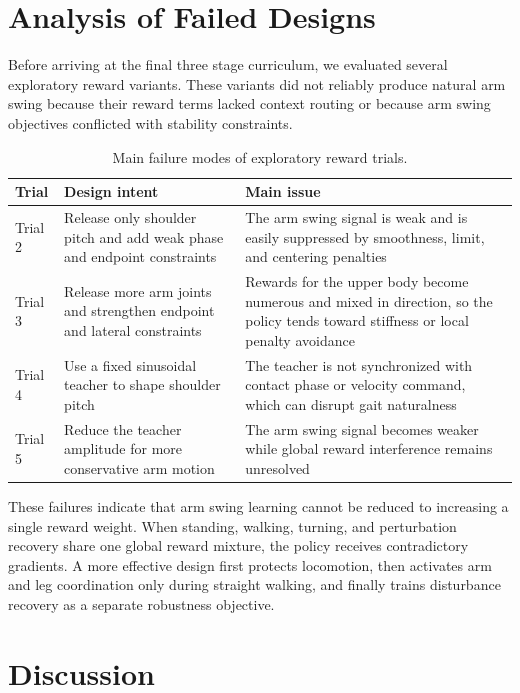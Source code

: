\documentclass{article}
\begin{document}
\section{Analysis of Failed Designs}

Before arriving at the final three stage curriculum, we evaluated several exploratory reward variants. These variants did not reliably produce natural arm swing because their reward terms lacked context routing or because arm swing objectives conflicted with stability constraints.

\begin{table}[t]
  \caption{Main failure modes of exploratory reward trials.}
  \label{tab:failed}
  \centering
  \small
  \begin{tabularx}{\linewidth}{lXX}
    \toprule
    Trial & Design intent & Main issue \\
    \midrule
    Trial 2 & Release only shoulder pitch and add weak phase and endpoint constraints & The arm swing signal is weak and is easily suppressed by smoothness, limit, and centering penalties \\
    Trial 3 & Release more arm joints and strengthen endpoint and lateral constraints & Rewards for the upper body become numerous and mixed in direction, so the policy tends toward stiffness or local penalty avoidance \\
    Trial 4 & Use a fixed sinusoidal teacher to shape shoulder pitch & The teacher is not synchronized with contact phase or velocity command, which can disrupt gait naturalness \\
    Trial 5 & Reduce the teacher amplitude for more conservative arm motion & The arm swing signal becomes weaker while global reward interference remains unresolved \\
    \bottomrule
  \end{tabularx}
\end{table}

These failures indicate that arm swing learning cannot be reduced to increasing a single reward weight. When standing, walking, turning, and perturbation recovery share one global reward mixture, the policy receives contradictory gradients. A more effective design first protects locomotion, then activates arm and leg coordination only during straight walking, and finally trains disturbance recovery as a separate robustness objective.

\section{Discussion}
\end{document}
